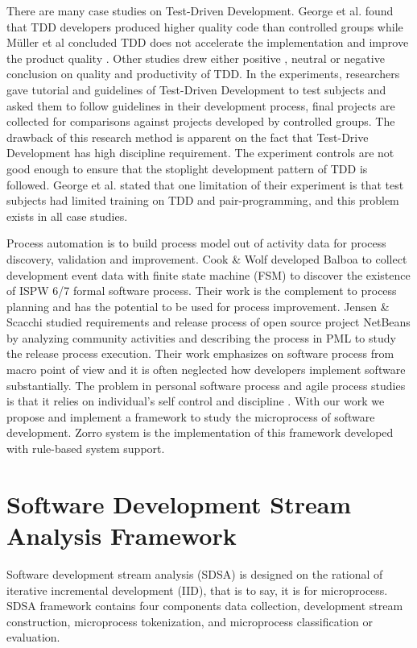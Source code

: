 \documentclass[11pt,twocolumn]{article}
\begin{document}
There are many case studies on Test-Driven Development. George et al. found
that TDD developers produced higher quality code \cite{George:04} than
controlled groups while M\"uller et al concluded TDD does not accelerate
the implementation and improve the product quality \cite{Muller:02}. Other
studies drew either positive \cite{Olan:03,Edwards:04}, neutral
\cite{Geras:04} or negative \cite{Matjaz:03} conclusion on quality and
productivity of TDD. In the experiments, researchers gave tutorial and
guidelines of Test-Driven Development to test subjects and asked them to
follow guidelines in their development process, final projects are
collected for comparisons against projects developed by controlled groups.
The drawback of this research method is apparent on the fact that Test-Drive
Development has high discipline requirement. The experiment controls are
not good enough to ensure that the stoplight development
pattern\cite{StopLight} of TDD is followed. George et al. stated that one
limitation of their experiment is that test subjects had limited training
on TDD and pair-programming\cite{George:04}, and this problem exists in all
case studies.

Process automation is to build process model out of activity data for
process discovery, validation and improvement. Cook \& Wolf\cite{Cook:95}
developed Balboa to collect development event data with finite state
machine (FSM) to discover the existence of ISPW 6/7 formal software
process. Their work is the complement to process planning and has the
potential to be used for process improvement. Jensen \&
Scacchi\cite{Jensen:04} studied requirements and release process of open
source project NetBeans by analyzing community activities and describing
the process in PML to study the release process execution. Their work
emphasizes on software process from macro point of view and it is often
neglected how developers implement software substantially. The problem in
personal software process and agile process studies is that it relies on
individual's self control and discipline \cite{Humphrey:99}. With our work
we propose and implement a framework to study the microprocess of software
development.  Zorro system is the implementation of this framework
developed with rule-based system support.

\section{Software Development Stream Analysis Framework}
\label{sec:framework}
Software development stream analysis (SDSA) is designed on the rational of
iterative incremental development (IID), that is to say, it is for
microprocess. SDSA framework contains four components data collection,
development stream construction, microprocess tokenization, and
microprocess classification or evaluation. 
\end{document}
